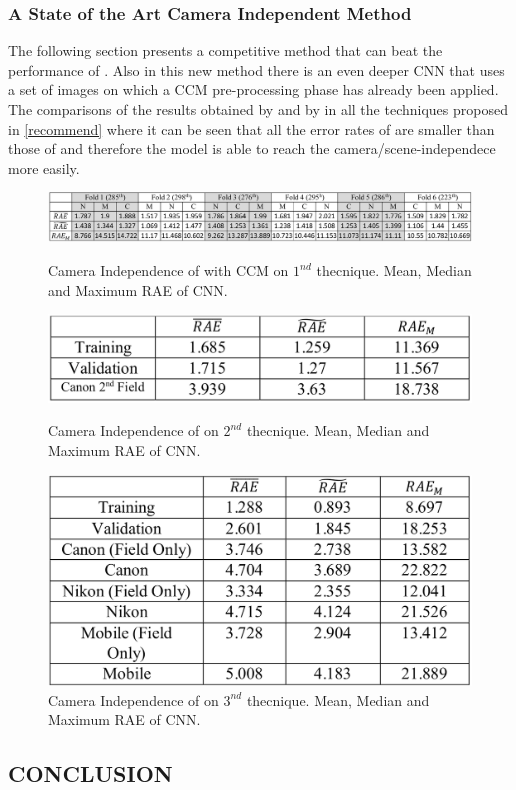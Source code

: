 \subsubsection{A State of the Art Camera Independent Method}
The following section presents a competitive method \cite{0807099125} that can beat the 
performance of \cite{0807099122}. Also in this new method there is an even deeper CNN 
that uses a set of images on which a CCM pre-processing phase has already 
been applied. The comparisons of the results obtained by \cite{0807099122} and by \cite{0807099125} in 
all the techniques proposed in \ref{recommend} where it can be seen that all the error 
rates of \cite{0807099125} are smaller than those of \cite{0807099122} and therefore the model is able to 
reach the camera/scene-independece more easily.
\begin{figure}[htbp]
    \centering
    \includegraphics[width = 1 \linewidth]{images/paper4/25tech1.png}
    \centering
    \caption{Camera Independence of \cite{0807099122} with CCM on $ 1^{nd} $ thecnique. Mean, Median and Maximum RAE of CNN.}
    \label{fig:25t1}
    \begin{minipage}[t]{.45\linewidth}
        \centering
        \includegraphics[width=\linewidth]{images/paper4/25tech2.png}
        \caption{\small Camera Independence of \cite{0807099122} on $ 2^{nd} $ thecnique. Mean, Median and Maximum RAE of CNN.}\label{fig:1}
    \end{minipage}
    \hfill
    \begin{minipage}{.45\linewidth}
        \centering
        \includegraphics[width=\linewidth]{images/paper4/25tech3.png}
        \caption{\small Camera Independence of \cite{0807099122} on $ 3^{nd} $ thecnique. Mean, Median and Maximum RAE of CNN.}\label{fig:1}
    \end{minipage}  
    \label{fig:1-2}
\end{figure}

\subsection{CONCLUSION}
